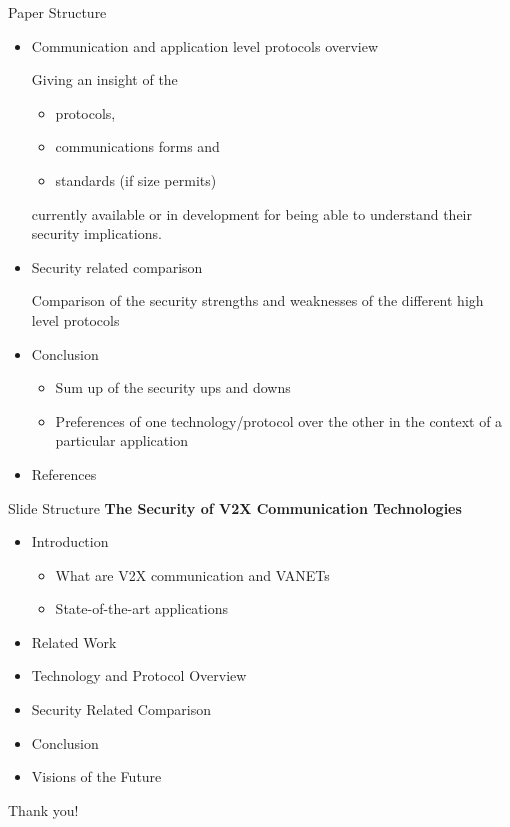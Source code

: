 \documentclass[]{beamer} %
\begin{document}
\begin{frame}[allowframebreaks]{Paper Structure}
\begin{itemize}
		\item Communication and application level protocols overview

			\medskip
			Giving an insight of the 
			\begin{itemize}
				\item protocols,
				\item communications forms and
				\item standards (if size permits)
			\end{itemize}
			currently available or in development for being able to understand
			their security implications.

		\item Security related comparison

			Comparison of the security strengths and weaknesses of the different
			high level protocols

		\item Conclusion

			\begin{itemize}
				\item Sum up of the security ups and downs
				\item Preferences of one technology/protocol over the other in the
					context of a particular application
			\end{itemize}

		\item References
	\end{itemize}
\end{frame}

\begin{frame}{Slide Structure}
	\textbf{The Security of V2X Communication Technologies}

	\begin{itemize}
		\item Introduction
			\begin{itemize}
				\item What are V2X communication and VANETs
				\item State-of-the-art applications
			\end{itemize}
		\item Related Work
		\item Technology and Protocol Overview
		\item Security Related Comparison
		\item Conclusion
		\item Visions of the Future
	\end{itemize}
\end{frame}

\begin{titleframe}
	\begin{center}
	\alert{\Large Thank you!}
	\end{center}
\end{titleframe}
\end{document}
